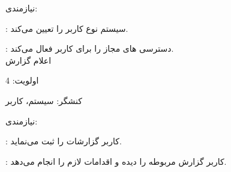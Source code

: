 \documentclass[oneside,a4paper,12pt]{book}
\begin{document}
\hspace{8 mm}	نیازمندی: 

\hspace{16 mm}	: سیستم نوع کاربر را تعیین می‌کند.

\hspace{16 mm}	: دسترسی های مجاز را برای کاربر فعال می‌کند.\\


\lr{\textbf{-}} \hspace{5 mm}  اعلام گزارش

\hspace{8 mm}	اولویت: 4

\hspace{8 mm}	کنشگر: سیستم، کاربر

\hspace{8 mm}	نیازمندی: 

\hspace{16 mm}	: کاربر گزارشات را ثبت می‌نماید.

\hspace{16 mm}	: کاربر گزارش مربوطه را دیده و اقدامات لازم را انجام می‌دهد.
\vspace{7 cm} 
\end{document}
